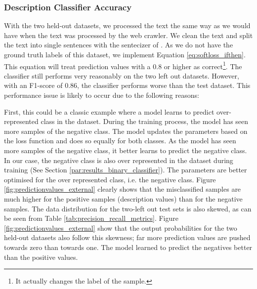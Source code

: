 \documentclass[a4paper, 12pt, oneside]{book} %
\begin{document}
\subsubsection{Description Classifier Accuracy}
With the two held-out datasets, we processed the text the same way as we would have when the text was processed by the web crawler. 
We clean the text and split the text into single sentences with the sentecizer of \textcite{honnibal_spacy_2020}.
As we do not have the ground truth labels of this dataset, we implement Equation \ref{eq:softloss_ifthen}.
This equation will treat prediction values with a 0.8 or higher as correct\footnote{It actually changes the label of the sample.}.
The classifier still performs very reasonably on the two left out datasets.
However, with an F1-score of 0.86, the classifier performs worse than the test dataset.
This performance issue is likely to occur due to the following reasons:

First, this could be a classic example where a model learns to predict over-represented class in the dataset.
During the training process, the model has seen more samples of the negative class.
The model updates the parameters based on the loss function and does so equally for both classes.
As the model has seen more samples of the negative class, it better learns to predict the negative class.
In our case, the negative class is also over represented in the dataset during training (See Section \ref{par:results_binary_classifier}).
The parameters are better optimised for the over represented class, i.e. the negative class.
Figure \ref{fig:predictionvalues_external} clearly shows that the misclassified samples are much higher for the positive samples (description values) than for the negative samples. 
The data distribution for the two-left out test sets is also skewed, as can be seen from Table \ref{tab:precision_recall_metrics}.
Figure \ref{fig:predictionvalues_external} show that the output probabilities for the two held-out datasets also follow this skewness; far more prediction values are pushed towards zero than towards one.
The model learned to predict the negatives better than the positive values.
\end{document}
